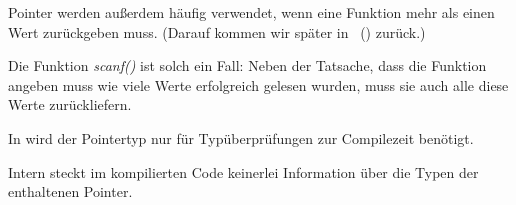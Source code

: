 Pointer werden außerdem häufig verwendet, wenn eine Funktion mehr als einen Wert zurückgeben muss. (Darauf kommen wir später in ~() zurück.)

Die Funktion \emph{scanf()} ist solch ein Fall: Neben der Tatsache, dass die Funktion angeben muss wie viele Werte erfolgreich gelesen wurden, muss sie auch alle diese Werte zurückliefern.

In \CCpp wird der Pointertyp nur für Typüberprüfungen zur Compilezeit benötigt.

Intern steckt im kompilierten Code keinerlei Information über die Typen der enthaltenen Pointer.






